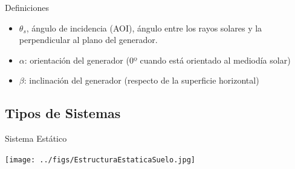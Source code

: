 \documentclass[xcolor={usenames,svgnames,dvipsnames}]{beamer}
\begin{document}
\begin{frame}[label={sec:org72d1fd7}]{Definiciones}
\begin{itemize}
\item \(\theta_s\), \alert{ángulo de incidencia (AOI)}, ángulo entre los rayos solares y la perpendicular al plano del generador.
\item \(\alpha\): \alert{orientación del generador} (0º cuando está orientado al mediodía solar)
\item \(\beta\): \alert{inclinación del generador} (respecto de la superficie horizontal)
\end{itemize}
\end{frame}
\subsection{Tipos de Sistemas}
\label{sec:org9dd0ad0}
\begin{frame}[label={sec:orgf4562eb}]{Sistema Estático}
\begin{center}
\texttt{[image: ../figs/EstructuraEstaticaSuelo.jpg]}
\end{center}
\end{frame}
\end{document}
